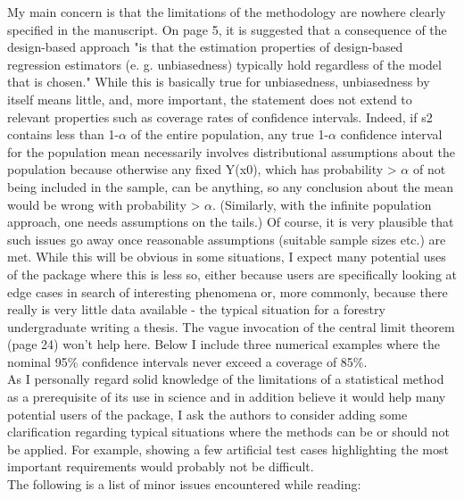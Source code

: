 \documentclass{article}
\begin{document}
My main concern is that the limitations of the methodology are nowhere clearly specified in the manuscript. On page 5, it is suggested that a consequence of the design-based approach "is that the estimation properties of design-based regression estimators (e. g. unbiasedness) typically hold regardless of the model that is chosen." While this is basically true for unbiasedness, unbiasedness by itself means little, and, more important, the statement does not extend to relevant properties such as coverage rates of confidence intervals. Indeed, if s2 contains less than 1-$\alpha$ of the entire population, any true 1-$\alpha$ confidence interval for the population mean necessarily involves distributional assumptions about the population because otherwise any fixed Y(x0), which has probability > $\alpha$ of not being included in the sample, can be anything, so any conclusion about the mean would be wrong with probability > $\alpha$. (Similarly, with the infinite population approach, one needs assumptions on the tails.) Of course, it is very plausible that such issues go away once reasonable assumptions (suitable sample sizes etc.) are met. While this will be obvious in some situations, I expect many potential uses of the package where this is less so, either because users are specifically looking at edge cases in search of interesting phenomena or, more commonly, because there really is very little data available - the typical situation for a forestry undergraduate writing a thesis. The vague invocation of the central limit theorem (page 24) won't help here. Below I include three numerical examples where the nominal 95\% confidence intervals never exceed a coverage of 85\%.\\

As I personally regard solid knowledge of the limitations of a statistical method as a prerequisite of its use in science and in addition believe it would help many potential users of the package, I ask the authors to consider adding some clarification regarding typical situations where the methods can be or should not be applied. For example, showing a few artificial test cases highlighting the most important requirements would probably not be difficult.\\

The following is a list of minor issues encountered while reading:\\
\end{document}
